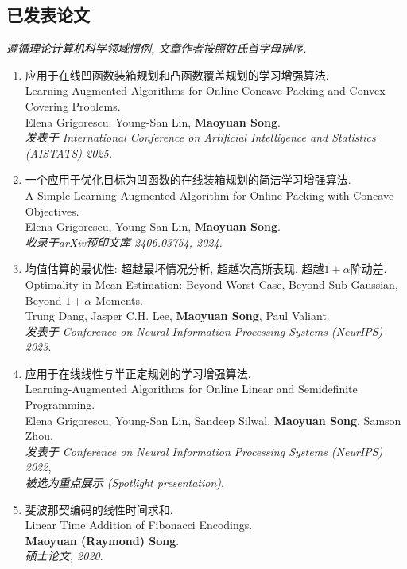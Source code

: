 \documentclass[margin, 10pt]{res-short} %
\begin{document}
\begin{resume}
\section{已发表论文}
{\it 遵循理论计算机科学领域惯例, 文章作者按照姓氏首字母排序.}
\begin{enumerate}
\item 应用于在线凹函数装箱规划和凸函数覆盖规划的学习增强算法.\\
Learning-Augmented Algorithms for Online Concave Packing and Convex Covering Problems.\\
Elena Grigorescu, Young-San Lin, {\bf Maoyuan Song}.\\
\emph{发表于 International Conference on Artificial Intelligence and Statistics (AISTATS) 2025.}
\item 一个应用于优化目标为凹函数的在线装箱规划的简洁学习增强算法.\\
A Simple Learning-Augmented Algorithm for Online Packing with Concave Objectives.\\
Elena Grigorescu, Young-San Lin, {\bf Maoyuan Song}.\\
\emph{收录于arXiv预印文库 2406.03754, 2024.}
\item 均值估算的最优性: 超越最坏情况分析, 超越次高斯表现, 超越$1 + \alpha$阶动差.\\
Optimality in Mean Estimation: Beyond Worst-Case, Beyond Sub-Gaussian, Beyond $1 + \alpha$ Moments.\\
Trung Dang, Jasper C.H. Lee, {\bf Maoyuan Song}, Paul Valiant.\\
\emph{发表于 Conference on Neural Information Processing Systems (NeurIPS) 2023}.
\item 应用于在线线性与半正定规划的学习增强算法.\\
Learning-Augmented Algorithms for Online Linear and Semidefinite Programming.\\
Elena Grigorescu, Young-San Lin, Sandeep Silwal, {\bf Maoyuan Song}, Samson Zhou.\\
\emph{发表于 Conference on Neural Information Processing Systems (NeurIPS) 2022},\\
\emph{被选为重点展示 (Spotlight presentation)}.
\item 斐波那契编码的线性时间求和.\\
Linear Time Addition of Fibonacci Encodings.\\
{\bf Maoyuan (Raymond) Song}.\\
\emph{硕士论文, 2020}.
\end{enumerate}


\end{resume}
\end{document}
